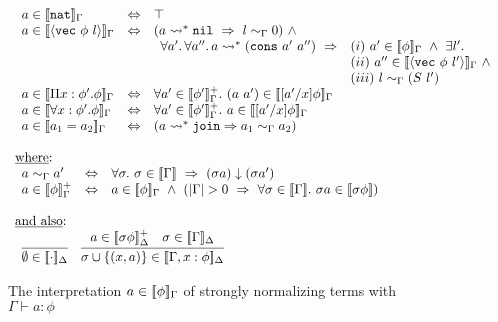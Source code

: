 \documentclass[copyright]{eptcs}
\newcommand{\To}{\Rightarrow}
\newcommand{\vc}[0]{\texttt{vec}}
\newcommand{\nat}[0]{\texttt{nat}}
\newcommand{\nil}[0]{\texttt{nil}}
\newcommand{\cons}[0]{\texttt{cons}}
\newcommand{\join}[0]{\texttt{join}}
\newcommand{\interp}[1]{[\negthinspace[#1]\negthinspace]}
\begin{document}
\begin{figure}
\[
\begin{array}{l}
\begin{array}{lll}
a \in \interp{\nat}_\Gamma & \Leftrightarrow & \top\\
a \in \interp{\langle\vc\ \phi\ l\rangle}_\Gamma & \Leftrightarrow & (a\leadsto^* \nil\ \To\  l \sim_\Gamma 0) \ \wedge\\
\ &\ & \begin{array}{ll}
       \forall a'.\, \forall a''.\, a\leadsto^* (\cons\ a'\ a'')\ \To  &
      (i)\ a'\in\interp{\phi}_\Gamma\ \wedge\ \exists l'. \\
\ &   (ii)\ a''\in\interp{\langle\vc\ \phi\ l'\rangle}_\Gamma\ \wedge\\ 
\ &   (iii)\ l \sim_\Gamma (S\ l')
\end{array}\\
a\in\interp{\Pi x:\phi'.\phi}_\Gamma & \Leftrightarrow & \forall a'\in\interp{\phi'}^+_\Gamma.\ (a\ a')\in\interp{[a'/x]\phi}_\Gamma \\
a\in\interp{\forall x:\phi'.\phi}_\Gamma & \Leftrightarrow & \forall a'\in\interp{\phi'}^+_\Gamma.\ a\in\interp{[a'/x]\phi}_\Gamma \\
a \in \interp{a_1 = a_2}_\Gamma & \Leftrightarrow & (a \leadsto^* \join \To a_1 \sim_\Gamma a_2) \\ 
\end{array}\\ \\
\textnormal{\underline{where}:}\\
\begin{array}{lll}

a \sim_\Gamma a' & \Leftrightarrow & \forall \sigma.\ \sigma\in\interp{\Gamma}\ \Rightarrow\ (\sigma a) \downarrow (\sigma a') \\ 

a\in\interp{\phi}^+_{\Gamma} & \Leftrightarrow & a\in\interp{\phi}_\Gamma
\ \wedge \ (|\Gamma| > 0 \ \To\ \forall \sigma\in\interp{\Gamma}.\ \sigma a\in\interp{\sigma \phi})
\end{array} \\ \\ 
\textnormal{\underline{and also}:} \\ 
\begin{array}{ll}
\infer{\emptyset\in\interp{\cdot}_{\Delta}}{\ }
&
\infer{\sigma\cup\{(x,a)\}\in\interp{\Gamma,x:\phi}_{\Delta}}
      {a\in\interp{\sigma\phi}^+_{\Delta} & \sigma \in\interp{\Gamma}_{\Delta}}
\end{array}
\end{array}
\]
\caption{The interpretation $a\in\interp{\phi}_\Gamma$ of strongly normalizing terms with $\Gamma\vdash a:\phi$}
\label{fig:interp}
\end{figure}
\end{document}
